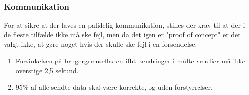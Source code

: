 \subsubsection{Kommunikation}
For at sikre at der laves en pålidelig kommunikation, stilles der krav til at der i de fleste tilfælde ikke må ske fejl, men da det igen er "proof of concept" er det valgt ikke, at gøre noget hvis der skulle ske fejl i en forsendelse.

\begin{enumerate}
	\item Forsinkelsen på brugergrænsefladen ifht. ændringer i målte værdier må ikke overstige 2,5 sekund. 
	\item 95\% af alle sendte data skal være korrekte, og uden forstyrrelser. 
\end{enumerate} 

